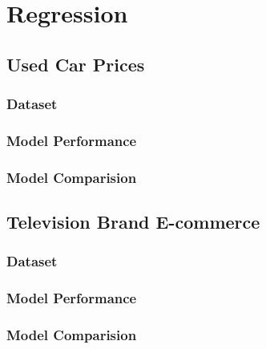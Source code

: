 \chapter{Regression}
\lipsum[2-2]

\section{Used Car Prices}
\lipsum[2-2]

\subsection{Dataset}
\lipsum[2-2]

\subsection{Model Performance}
\lipsum[2-2]

\subsection{Model Comparision}
\lipsum[2-2]


\section{Television Brand E-commerce}
\lipsum[2-2]

\subsection{Dataset}
\lipsum[2-2]

\subsection{Model Performance}
\lipsum[2-2]

\subsection{Model Comparision}
\lipsum[2-2]